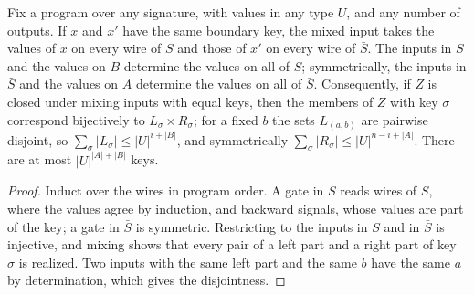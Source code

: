 \begin{lemma}
  \label{lem:lowerbounds-algebraic-single-cut-fibres}
  \leanok
  Fix a program over any signature, with values in any type $U$, and any
  number of outputs. If $x$ and $x'$ have the same boundary key, the mixed
  input takes the values of $x$ on every wire of $S$ and those of $x'$ on
  every wire of $\bar S$. The inputs in $S$ and the values on $B$ determine
  the values on all of $S$; symmetrically, the inputs in $\bar S$ and the
  values on $A$ determine the values on all of $\bar S$. Consequently, if $Z$
  is closed under mixing inputs with equal keys, then the members of $Z$ with
  key $\sigma$ correspond bijectively to $L_\sigma \times R_\sigma$; for a
  fixed $b$ the sets $L_{(a, b)}$ are pairwise disjoint, so
  $\sum_\sigma |L_\sigma| \le |U|^{i + |B|}$, and symmetrically
  $\sum_\sigma |R_\sigma| \le |U|^{n - i + |A|}$. There are at most
  $|U|^{|A| + |B|}$ keys.
\end{lemma}
\begin{proof}
  \leanok
  Induct over the wires in program order. A gate in $S$ reads wires of $S$,
  where the values agree by induction, and backward signals, whose values are
  part of the key; a gate in $\bar S$ is symmetric. Restricting to the inputs
  in $S$ and in $\bar S$ is injective, and mixing shows that every pair of a
  left part and a right part of key $\sigma$ is realized. Two inputs with the
  same left part and the same $b$ have the same $a$ by determination, which
  gives the disjointness.
\end{proof}

